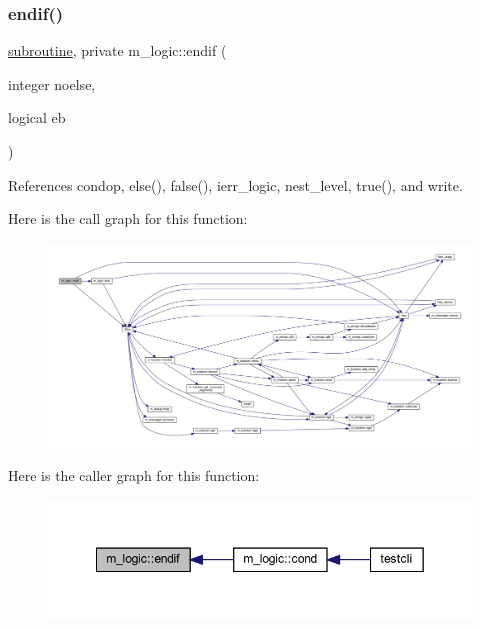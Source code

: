 \subsubsection{\texorpdfstring{endif()}{endif()}}
{\footnotesize\ttfamily \hyperlink{M__stopwatch_83_8txt_acfbcff50169d691ff02d4a123ed70482}{subroutine}, private m\+\_\+logic\+::endif (\begin{DoxyParamCaption}\item[{integer}]{noelse,  }\item[{logical}]{eb }\end{DoxyParamCaption})\hspace{0.3cm}{\ttfamily [private]}}



References condop, else(), false(), ierr\+\_\+logic, nest\+\_\+level, true(), and write.

Here is the call graph for this function\+:
\nopagebreak
\begin{figure}[H]
\begin{center}
\leavevmode
\includegraphics[width=350pt]{namespacem__logic_a60ae51929ab2f5d32f2a8f7e07e6debc_cgraph}
\end{center}
\end{figure}
Here is the caller graph for this function\+:
\nopagebreak
\begin{figure}[H]
\begin{center}
\leavevmode
\includegraphics[width=349pt]{namespacem__logic_a60ae51929ab2f5d32f2a8f7e07e6debc_icgraph}
\end{center}
\end{figure}
\mbox{\label{namespacem__logic_aa03730fb0581290fa8c776b633430584}} 
